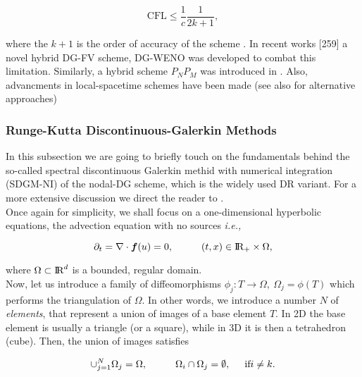 \begin{equation}
\text{CFL} \leq \frac{1}{c}\frac{1}{2k + 1},
\end{equation}

where the $k+1$ is the order of accuracy of the scheme \cite{Cockburn:2001}. In recent works [259]\cite{Qiu:2005,Qiu:2004} a novel hybrid DG-FV scheme, DG-WENO was developed to combat this limitation. Similarly, a hybrid scheme $P_N P_M$ was introduced in \cite{Dumbser:2009,Dumbser:2008}. Also, advancments in local-spacetime schemes have been made \cite{Gassner:2011} (see also \cite{Hesthaven:2007} for alternative approaches)

\subsubsection{Runge-Kutta Discontinuous-Galerkin Methods}

In this subsection we are going to briefly touch on the fundamentals behind the so-called spectral discontinuous Galerkin methid with numerical integration (SDGM-NI) of the nodal-DG scheme, which is the widely used DR variant. For a more extensive discussion we direct the reader to \cite{Hesthaven:2007}. \\

Once again for simplicity, we shall focus on a one-dimensional hyperbolic equations, the advection equation with no sources \textit{i.e.,}

\begin{equation}
\partial_t = \nabla\cdot\boldsymbol{f}(u) =0, \hspace{10mm} (t,x)\in \text{I\!R}_{+} \times\Omega,
\label{eq:theory:dg:adveq}
\end{equation}

where $\Omega\subset \text{I\!R}^{d}$ is a bounded, regular domain. \\

Now, let us introduce a family of diffeomorphisms $\phi_{j}: T\rightarrow\Omega,\:\Omega_{j}=\phi(T)$ which performs the triangulation of $\Omega$. In other words, we introduce a number $N$ of \textit{elements}, that represent a union of images of a base element $T$. In 2D the base element is usually a triangle (or a square), while in 3D it is then a tetrahedron (cube). Then, the union of images satisfies

\begin{equation}
\cup_{j=1}^{N}\Omega_{j} = \Omega, \hspace{10mm} \Omega_{i}\cap\Omega_{j} = \emptyset, \hspace{5mm} \text{if} i\neq k.
\end{equation}

